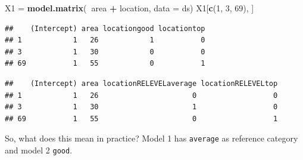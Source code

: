 \documentclass[10pt,ignorenonframetext,]{beamer}
\newenvironment{Shaded}{\begin{snugshade}}{\end{snugshade}}
\newcommand{\KeywordTok}[1]{\textcolor[rgb]{0.13,0.29,0.53}{\textbf{#1}}}
\newcommand{\DataTypeTok}[1]{\textcolor[rgb]{0.13,0.29,0.53}{#1}}
\newcommand{\DecValTok}[1]{\textcolor[rgb]{0.00,0.00,0.81}{#1}}
\newcommand{\StringTok}[1]{\textcolor[rgb]{0.31,0.60,0.02}{#1}}
\newcommand{\OperatorTok}[1]{\textcolor[rgb]{0.81,0.36,0.00}{\textbf{#1}}}
\newcommand{\NormalTok}[1]{#1}
\begin{document}
\begin{frame}[fragile]

\begin{Shaded}
\begin{Highlighting}[]
\NormalTok{X1 =}\StringTok{ }\KeywordTok{model.matrix}\NormalTok{(}\OperatorTok{~}\NormalTok{area }\OperatorTok{+}\StringTok{ }\NormalTok{location, }\DataTypeTok{data =}\NormalTok{ ds)}
\NormalTok{X1[}\KeywordTok{c}\NormalTok{(}\DecValTok{1}\NormalTok{, }\DecValTok{3}\NormalTok{, }\DecValTok{69}\NormalTok{), ]}
\end{Highlighting}
\end{Shaded}

\begin{verbatim}
##    (Intercept) area locationgood locationtop
## 1            1   26            1           0
## 3            1   30            0           0
## 69           1   55            0           1
\end{verbatim}

\begin{Shaded}
\end{Shaded}

\begin{verbatim}
##    (Intercept) area locationRELEVELaverage locationRELEVELtop
## 1            1   26                      0                  0
## 3            1   30                      1                  0
## 69           1   55                      0                  1
\end{verbatim}

So, what does this mean in practice? Model 1 has \texttt{average} as
reference category and model 2 \texttt{good}.

\end{frame}
\end{document}
